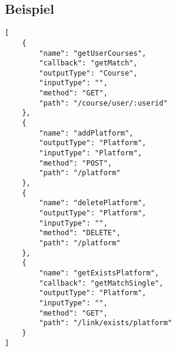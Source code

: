 \documentclass[10pt,a4paper,final,parskip]{scrartcl}
\numberwithin{equation}{section}
\begin{document}
\subsection{Beispiel}
\begin{minipage}{\textwidth}
\begin{lstlisting}
[
    {
        "name": "getUserCourses",
        "callback": "getMatch",
        "outputType": "Course",
        "inputType": "",
        "method": "GET",
        "path": "/course/user/:userid"
    },
    {
        "name": "addPlatform",
        "outputType": "Platform",
        "inputType": "Platform",
        "method": "POST",
        "path": "/platform"
    },
    {
        "name": "deletePlatform",
        "outputType": "Platform",
        "inputType": "",
        "method": "DELETE",
        "path": "/platform"
    },
    {
        "name": "getExistsPlatform",
        "callback": "getMatchSingle",
        "outputType": "Platform",
        "inputType": "",
        "method": "GET",
        "path": "/link/exists/platform"
    }
]
\end{lstlisting}
\end{minipage}
\end{document}
